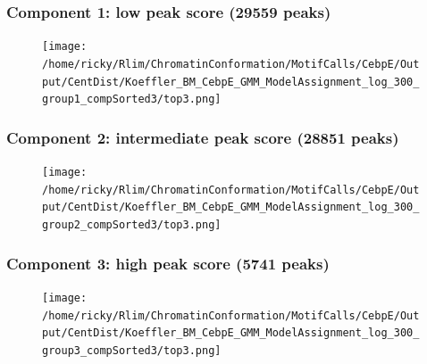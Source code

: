 \documentclass[notes]{beamer}
\begin{document}
\begin{frame}[plain]
    \frametitle{Component 1: low peak score (29559 peaks)}
    \begin{figure}
        \texttt{[image: /home/ricky/Rlim/ChromatinConformation/MotifCalls/CebpE/Output/CentDist/Koeffler\_BM\_CebpE\_GMM\_ModelAssignment\_log\_300\_group1\_compSorted3/top3.png]}
    \end{figure}
\end{frame}

\begin{frame}[plain]
    \frametitle{Component 2: intermediate peak score (28851 peaks)}
    \begin{figure}
        \texttt{[image: /home/ricky/Rlim/ChromatinConformation/MotifCalls/CebpE/Output/CentDist/Koeffler\_BM\_CebpE\_GMM\_ModelAssignment\_log\_300\_group2\_compSorted3/top3.png]}
    \end{figure}
\end{frame}

\begin{frame}[plain]
    \frametitle{Component 3: high peak score (5741 peaks)}
    \begin{figure}
        \texttt{[image: /home/ricky/Rlim/ChromatinConformation/MotifCalls/CebpE/Output/CentDist/Koeffler\_BM\_CebpE\_GMM\_ModelAssignment\_log\_300\_group3\_compSorted3/top3.png]}
    \end{figure}
\end{frame}


\end{document}
